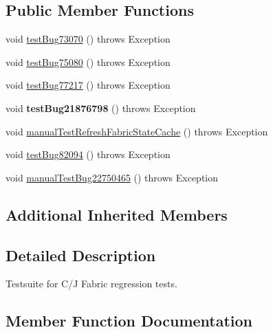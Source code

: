 \subsection*{Public Member Functions}
\begin{DoxyCompactItemize}
\item 
void \mbox{\hyperlink{classtestsuite_1_1fabric_1_1jdbc_1_1_test_regressions_a62bab22c5e479b7c4f07339b0085a73a}{test\+Bug73070}} ()  throws Exception 
\item 
void \mbox{\hyperlink{classtestsuite_1_1fabric_1_1jdbc_1_1_test_regressions_a4e0d710d5707438a3ccd2dde61938f1c}{test\+Bug75080}} ()  throws Exception 
\item 
void \mbox{\hyperlink{classtestsuite_1_1fabric_1_1jdbc_1_1_test_regressions_a3ce60c17f8f082b01d2d313de8a469e3}{test\+Bug77217}} ()  throws Exception 
\item 
\mbox{\label{classtestsuite_1_1fabric_1_1jdbc_1_1_test_regressions_a885bc6c98b4fc64cf1ffa2a1d46271c6}} 
void {\bfseries test\+Bug21876798} ()  throws Exception 
\item 
void \mbox{\hyperlink{classtestsuite_1_1fabric_1_1jdbc_1_1_test_regressions_a97a6970c2925c2feddfeceac2e0a1d71}{manual\+Test\+Refresh\+Fabric\+State\+Cache}} ()  throws Exception 
\item 
void \mbox{\hyperlink{classtestsuite_1_1fabric_1_1jdbc_1_1_test_regressions_a7b46187e3a7d4a9951d8cd51344b090e}{test\+Bug82094}} ()  throws Exception 
\item 
void \mbox{\hyperlink{classtestsuite_1_1fabric_1_1jdbc_1_1_test_regressions_a832cdff2250e770858c18a1143e689ad}{manual\+Test\+Bug22750465}} ()  throws Exception 
\end{DoxyCompactItemize}
\subsection*{Additional Inherited Members}


\subsection{Detailed Description}
Testsuite for C/J Fabric regression tests. 

\subsection{Member Function Documentation}
\mbox{\label{classtestsuite_1_1fabric_1_1jdbc_1_1_test_regressions_a832cdff2250e770858c18a1143e689ad}} 
